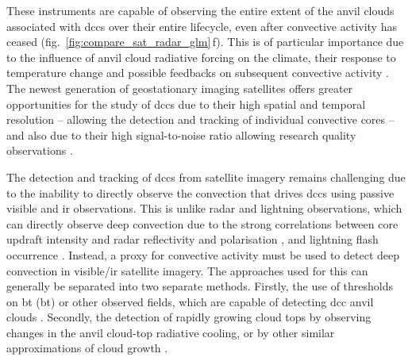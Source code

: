 These instruments are capable of observing the entire extent of the anvil clouds associated with \acrshort{dcc}s over their entire lifecycle, even after convective activity has ceased (fig.~\ref{fig:compare_sat_radar_glm}\,f).
This is of particular importance due to the influence of anvil cloud radiative forcing on the climate, their response to temperature change \citep{bony_thermodynamic_2016, hartmann_tropical_2016, ceppi_cloud_2017, gasparini_what_2019} and possible feedbacks on subsequent convective activity \citep{varble_erroneous_2018}.
The newest generation of geostationary imaging satellites offers greater opportunities for the study of \acrshort{dcc}s due to their high spatial and temporal resolution -- allowing the detection and tracking of individual convective cores \citep{heikenfeld_tobac_2019} -- and also due to their high signal-to-noise ratio allowing research quality observations \citep{iacovazzi_goes-16_2020}.

The detection and tracking of \acrshort{dcc}s from satellite imagery remains challenging due to the inability to directly observe the convection that drives \acrshort{dcc}s using passive visible and \acrshort{ir} observations.
This is unlike radar and lightning observations, which can directly observe deep convection due to the strong correlations between core updraft intensity and radar reflectivity and polarisation \citep{austin_relation_1987, rosenfeld_general_1993, zipser_vertical_1994},  and lightning flash occurrence \citep{williams_relationship_1989, deierling_total_2008, wang_relationship_2017}.
Instead, a proxy for convective activity must be used to detect deep convection in visible/\acrshort{ir} satellite imagery.
The approaches used for this can generally be separated into two separate methods. 
Firstly, the use of thresholds on \acrshort{bt} (\acrshort{bt}) or other observed fields, which are capable of detecting \acrshort{dcc} anvil clouds \citep[e.g.][]{schmetz_monitoring_1997, hong_detection_2005, schroder_deep_2009, liang_integrated_2017, senf_size-resolved_2018}.
Secondly, the detection of rapidly growing cloud tops by observing changes in the anvil cloud-top radiative cooling, or by other similar approximations of cloud growth \citep{zinner_cb-tram:_2008, bedka_objective_2010, muller_novel_2019}.

